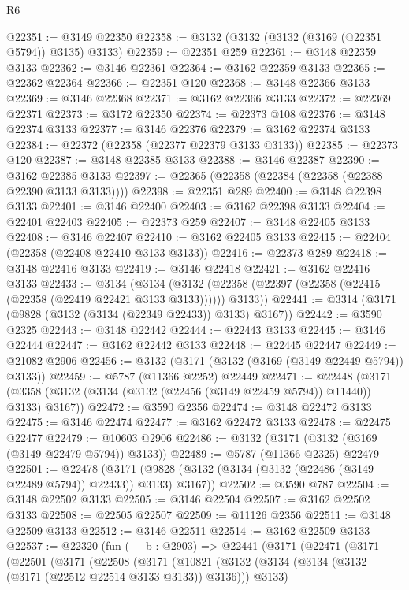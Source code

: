\begin{lexlean}{R6}
\begin{coremodule}
@22351 := @3149 @22350
@22358 := @3132 (@3132 (@3132 (@3169 (@22351 @5794)) @3135) @3133)
@22359 := @22351 @259
@22361 := @3148 @22359 @3133
@22362 := @3146 @22361
@22364 := @3162 @22359 @3133
@22365 := @22362 @22364
@22366 := @22351 @120
@22368 := @3148 @22366 @3133
@22369 := @3146 @22368
@22371 := @3162 @22366 @3133
@22372 := @22369 @22371
@22373 := @3172 @22350
@22374 := @22373 @108
@22376 := @3148 @22374 @3133
@22377 := @3146 @22376
@22379 := @3162 @22374 @3133
@22384 := @22372 (@22358 (@22377 @22379 @3133 @3133))
@22385 := @22373 @120
@22387 := @3148 @22385 @3133
@22388 := @3146 @22387
@22390 := @3162 @22385 @3133
@22397 := @22365 (@22358 (@22384 (@22358 (@22388 @22390 @3133 @3133))))
@22398 := @22351 @289
@22400 := @3148 @22398 @3133
@22401 := @3146 @22400
@22403 := @3162 @22398 @3133
@22404 := @22401 @22403
@22405 := @22373 @259
@22407 := @3148 @22405 @3133
@22408 := @3146 @22407
@22410 := @3162 @22405 @3133
@22415 := @22404 (@22358 (@22408 @22410 @3133 @3133))
@22416 := @22373 @289
@22418 := @3148 @22416 @3133
@22419 := @3146 @22418
@22421 := @3162 @22416 @3133
@22433 := @3134
    (@3134 (@3132 (@22358 (@22397 (@22358 (@22415 (@22358 (@22419 @22421 @3133 @3133)))))) @3133))
@22441 := @3314 (@3171 (@9828 (@3132 (@3134 (@22349 @22433)) @3133) @3167))
@22442 := @3590 @2325
@22443 := @3148 @22442
@22444 := @22443 @3133
@22445 := @3146 @22444
@22447 := @3162 @22442 @3133
@22448 := @22445 @22447
@22449 := @21082 @2906
@22456 := @3132 (@3171 (@3132 (@3169 (@3149 @22449 @5794)) @3133))
@22459 := @5787 (@11366 @2252) @22449
@22471 := @22448
    (@3171 (@3358 (@3132 (@3134 (@3132 (@22456 (@3149 @22459 @5794)) @11440)) @3133) @3167))
@22472 := @3590 @2356
@22474 := @3148 @22472 @3133
@22475 := @3146 @22474
@22477 := @3162 @22472 @3133
@22478 := @22475 @22477
@22479 := @10603 @2906
@22486 := @3132 (@3171 (@3132 (@3169 (@3149 @22479 @5794)) @3133))
@22489 := @5787 (@11366 @2325) @22479
@22501 := @22478
    (@3171 (@9828 (@3132 (@3134 (@3132 (@22486 (@3149 @22489 @5794)) @22433)) @3133) @3167))
@22502 := @3590 @787
@22504 := @3148 @22502 @3133
@22505 := @3146 @22504
@22507 := @3162 @22502 @3133
@22508 := @22505 @22507
@22509 := @11126 @2356
@22511 := @3148 @22509 @3133
@22512 := @3146 @22511
@22514 := @3162 @22509 @3133
@22537 := @22320
    (fun (__b : @2903) =>
    @22441
      (@3171
        (@22471
          (@3171
            (@22501
              (@3171
                (@22508
                  (@3171
                    (@10821
                      (@3132
                        (@3134 (@3134 (@3132 (@3171 (@22512 @22514 @3133 @3133)) @3136)))
                        @3133)

\end{coremodule}
\end{lexlean}

